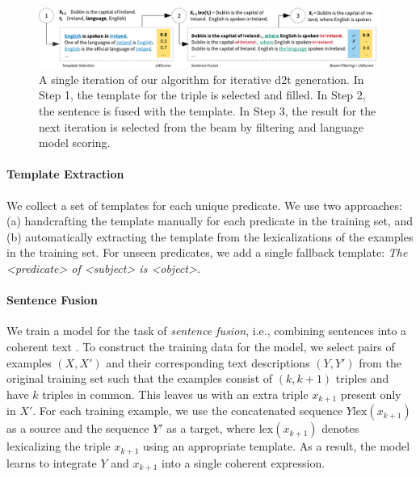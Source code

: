 \begin{figure}[t]
    \centering
    \includegraphics[width=\textwidth]{img/d2t_text_editing}
    \caption{A single iteration of our algorithm for iterative \ac{d2t} generation. In Step 1, the template for the triple is selected and filled. In Step 2, the sentence is fused with the template. In Step 3, the result for the next iteration is selected from the beam by filtering and language model scoring.}\label{fig:iterative:alg}
\end{figure}



\paragraph{Template Extraction}
We collect a set of templates for each unique predicate. We use two approaches: (a) handcrafting the template manually for each predicate in the training set, and (b) automatically extracting the template from the lexicalizations of the examples  in the training set. For unseen predicates, we add a single fallback template: \textit{The <predicate> of <subject> is <object>.}


\paragraph{Sentence Fusion}
We train a model for the task of \emph{sentence fusion}, i.e., combining sentences into a coherent text \cite{barzilay2005sentence}.
To construct the training data for the model, we select pairs of examples $(X, X')$ and their corresponding text descriptions $(Y, Y')$ from the original training set such that the examples consist of $(k, k+1)$ triples and have $k$ triples in common. This leaves us with an extra triple $x_{k+1}$ present only in $X'$. For each training example, we use the concatenated sequence $Y \mathrm{lex}(x_{k+1})$ as a source and the sequence $Y'$ as a target, where $\mathrm{lex}(x_{k+1})$ denotes lexicalizing the triple $x_{k+1}$ using an appropriate template.
As a result, the model learns to integrate $Y$ and $x_{k+1}$ into a single coherent expression.


